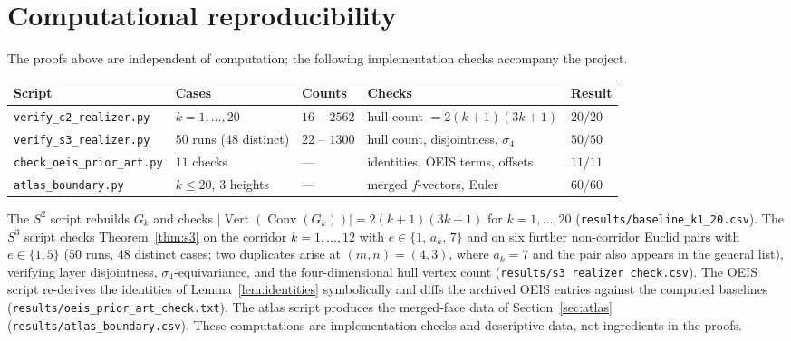 \documentclass[11pt]{article}
\theoremstyle{definition}
\theoremstyle{remark}
\newcommand{\Vertset}{\operatorname{Vert}}
\newcommand{\Conv}{\operatorname{Conv}}
\begin{document}
\appendix

\section{Computational reproducibility}\label{app:comp}

The proofs above are independent of computation; the following
implementation checks accompany the project.

\begin{center}
\begin{tabular}{lllll}
\toprule
Script & Cases & Counts & Checks & Result \\
\midrule
\texttt{verify\_c2\_realizer.py} & $k=1,\dots,20$ & $16$ -- $2562$ &
hull count $=2(k{+}1)(3k{+}1)$ & $20/20$ \\
\texttt{verify\_s3\_realizer.py} & $50$ runs ($48$ distinct) & $22$ -- $1300$ &
hull count, disjointness, $\sigma_4$ & $50/50$ \\
\texttt{check\_oeis\_prior\_art.py} & $11$ checks & --- &
identities, OEIS terms, offsets & $11/11$ \\
\texttt{atlas\_boundary.py} & $k\le20$, $3$ heights & --- &
merged $f$-vectors, Euler & $60/60$ \\
\bottomrule
\end{tabular}
\end{center}

The $S^2$ script rebuilds $G_k$ and checks
$|\Vertset(\Conv(G_k))|=2(k+1)(3k+1)$ for $k=1,\dots,20$
(\texttt{results/baseline\_k1\_20.csv}). The $S^3$ script checks
Theorem~\ref{thm:s3} on the corridor $k=1,\dots,12$ with
$e\in\{1,\,a_k,\,7\}$ and on six further non-corridor Euclid pairs with
$e\in\{1,5\}$ ($50$ runs, $48$ distinct cases; two duplicates arise at
$(m,n)=(4,3)$, where $a_k=7$ and the pair also appears in the general
list), verifying layer disjointness, $\sigma_4$-equivariance, and
the four-dimensional hull vertex count
(\texttt{results/s3\_realizer\_check.csv}). The OEIS script re-derives the
identities of Lemma~\ref{lem:identities} symbolically and diffs the
archived OEIS entries against the computed baselines
(\texttt{results/oeis\_prior\_art\_check.txt}). The atlas script produces
the merged-face data of Section~\ref{sec:atlas}
(\texttt{results/atlas\_boundary.csv}). These computations are
implementation checks and descriptive data, not ingredients in the
proofs.
\end{document}
